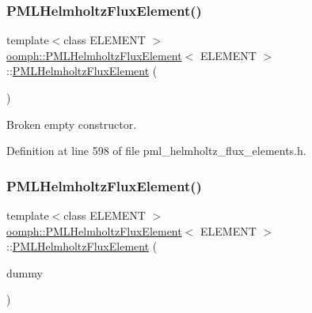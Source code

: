 \mbox{\label{classoomph_1_1PMLHelmholtzFluxElement_acb256db0e635dc3f21a526d0feacbc32}} 
\subsubsection{\texorpdfstring{P\+M\+L\+Helmholtz\+Flux\+Element()}{PMLHelmholtzFluxElement()}\hspace{0.1cm}{\footnotesize\ttfamily [2/3]}}
{\footnotesize\ttfamily template$<$class E\+L\+E\+M\+E\+NT $>$ \\
\hyperlink{classoomph_1_1PMLHelmholtzFluxElement}{oomph\+::\+P\+M\+L\+Helmholtz\+Flux\+Element}$<$ E\+L\+E\+M\+E\+NT $>$\+::\hyperlink{classoomph_1_1PMLHelmholtzFluxElement}{P\+M\+L\+Helmholtz\+Flux\+Element} (\begin{DoxyParamCaption}{ }\end{DoxyParamCaption})\hspace{0.3cm}{\ttfamily [inline]}}



Broken empty constructor. 



Definition at line 598 of file pml\+\_\+helmholtz\+\_\+flux\+\_\+elements.\+h.

\mbox{\label{classoomph_1_1PMLHelmholtzFluxElement_a9f38586456c3181bceff2de8d8b150fb}} 
\subsubsection{\texorpdfstring{P\+M\+L\+Helmholtz\+Flux\+Element()}{PMLHelmholtzFluxElement()}\hspace{0.1cm}{\footnotesize\ttfamily [3/3]}}
{\footnotesize\ttfamily template$<$class E\+L\+E\+M\+E\+NT $>$ \\
\hyperlink{classoomph_1_1PMLHelmholtzFluxElement}{oomph\+::\+P\+M\+L\+Helmholtz\+Flux\+Element}$<$ E\+L\+E\+M\+E\+NT $>$\+::\hyperlink{classoomph_1_1PMLHelmholtzFluxElement}{P\+M\+L\+Helmholtz\+Flux\+Element} (\begin{DoxyParamCaption}\item[{const \hyperlink{classoomph_1_1PMLHelmholtzFluxElement}{P\+M\+L\+Helmholtz\+Flux\+Element}$<$ E\+L\+E\+M\+E\+NT $>$ \&}]{dummy }\end{DoxyParamCaption})\hspace{0.3cm}{\ttfamily [inline]}}



